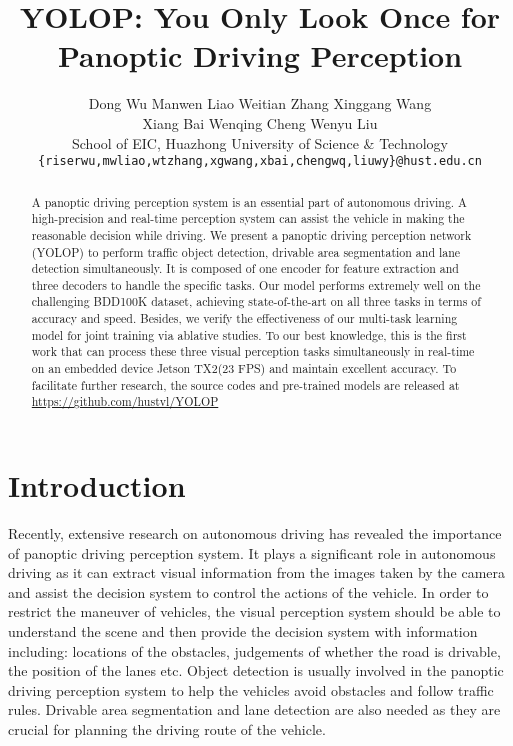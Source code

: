 \documentclass[10pt,twocolumn,letterpaper]{article}
\begin{document}
\title{YOLOP: You Only Look Once for Panoptic Driving Perception}

\author{Dong Wu \quad Manwen Liao \quad Weitian Zhang \quad Xinggang Wang\\ 
\quad Xiang Bai \quad Wenqing Cheng \quad Wenyu Liu\\
School of EIC, Huazhong University of Science \& Technology\\
{\tt\small \{riserwu,mwliao,wtzhang,xgwang,xbai,chengwq,liuwy\}@hust.edu.cn}
}
\maketitle

\begin{abstract}
   A panoptic driving perception system is an essential part of autonomous driving. A high-precision and real-time perception system can assist the vehicle in making the reasonable decision while driving. We present a panoptic driving perception network (YOLOP) to perform traffic object detection, drivable area segmentation and lane detection simultaneously. It is composed of one encoder for feature extraction and three decoders to handle the specific tasks. Our model performs extremely well on the challenging BDD100K dataset, achieving state-of-the-art on all three tasks in terms of accuracy and speed. Besides, we verify the effectiveness of our multi-task learning model for joint training via ablative studies. To our best knowledge, this is the first work that can process these three visual perception tasks simultaneously in real-time on an embedded device Jetson TX2(23 FPS) and maintain excellent accuracy. To facilitate further research, the source codes and pre-trained models are released at \url{https://github.com/hustvl/YOLOP}
\end{abstract}

\section{Introduction}
\label{sec:intro}

Recently, extensive research on autonomous driving has revealed the importance of panoptic driving perception system. It plays a significant role in autonomous driving as it can extract visual information from the images taken by the camera and assist the decision system to control the actions of the vehicle. In order to restrict the maneuver of vehicles, the visual perception system should be able to understand the scene and then provide the decision system with information including: locations of the obstacles, judgements of whether the road is drivable, the position of the lanes etc. Object detection is usually involved in the panoptic driving perception system to help the vehicles avoid obstacles and follow traffic rules. Drivable area segmentation and lane detection are also needed as they are crucial for planning the driving route of the vehicle.
\end{document}
